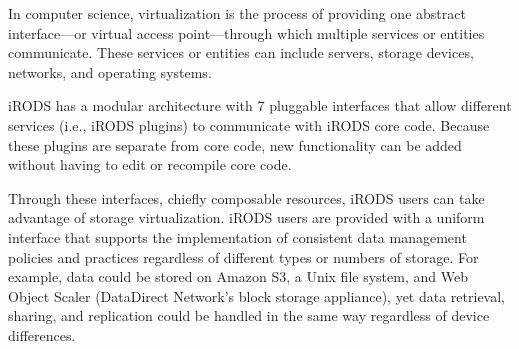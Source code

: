 \documentclass[10pt,oneside]{memoir}
\begin{document}
In computer science, virtualization is the process of providing one abstract interface---or virtual access point---through which multiple services or entities communicate. These services or entities can include servers, storage devices, networks, and operating systems.

iRODS has a modular architecture with 7 pluggable interfaces that allow different services (i.e., iRODS plugins) to communicate with iRODS core code. Because these plugins are separate from core code, new functionality can be added without having to edit or recompile core code.

Through these interfaces, chiefly composable resources, iRODS users can take advantage of storage virtualization. iRODS users are provided with a uniform interface that supports the implementation of consistent data management policies and practices regardless of different types or numbers of storage. For example, data could be stored on Amazon S3, a Unix file system, and Web Object Scaler (DataDirect Network's block storage appliance), yet data retrieval, sharing, and replication could be handled in the same way regardless of device differences.
\end{document}
